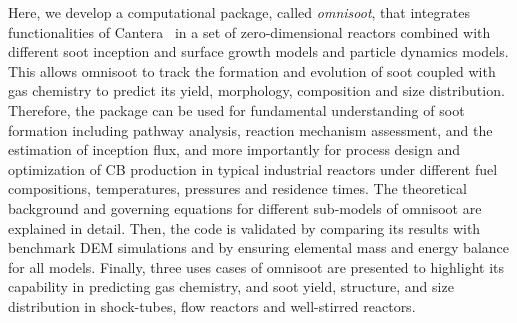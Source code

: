 




Here, we develop a computational package, called \textit{omnisoot}, that integrates functionalities of Cantera~\citep{cantera} in a set of zero-dimensional reactors combined with different soot inception and surface growth models and particle dynamics models. This allows omnisoot to track the formation and evolution of soot coupled with gas chemistry to predict its yield, morphology, composition and size distribution. Therefore, the package can be used for fundamental understanding of soot formation including pathway analysis, reaction mechanism assessment, and the estimation of inception flux, and more importantly for process design and optimization of CB production in typical industrial reactors under different fuel compositions, temperatures, pressures and residence times. The theoretical background and governing equations for different sub-models of omnisoot are explained in detail. Then, the code is validated by comparing its results with benchmark DEM simulations and by ensuring elemental mass and energy balance for all models. Finally, three uses cases of omnisoot are presented to highlight its capability in predicting gas chemistry, and soot yield, structure, and size distribution in shock-tubes, flow reactors and well-stirred reactors.





